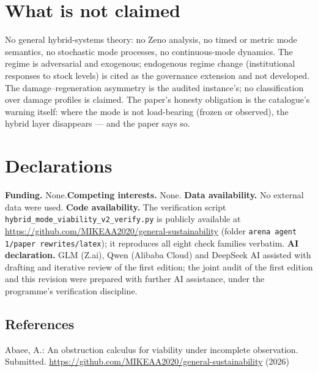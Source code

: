 \documentclass[10pt,twocolumn]{article}
\theoremstyle{definition}
\begin{document}
\section{What is not claimed}

No general hybrid-systems theory: no Zeno analysis, no timed or metric
mode semantics, no stochastic mode processes, no continuous-mode dynamics.
The regime is adversarial and exogenous; endogenous regime change
(institutional responses to stock levels) is cited as the governance
extension and not developed. The damage--regeneration asymmetry is the
audited instance's; no classification over damage profiles is claimed.
The paper's honesty obligation is the catalogue's warning itself: where
the mode is not load-bearing (frozen or observed), the hybrid layer
disappears --- and the paper says so.


\section*{Declarations}
\textbf{Funding.} None.\quad \textbf{Competing interests.} None.\quad
\textbf{Data availability.} No external data were used.\quad
\textbf{Code availability.} The verification script
\texttt{hybrid\_mode\_viability\_v2\_verify.py} is publicly available at
\url{https://github.com/MIKEAA2020/general-sustainability} (folder
\texttt{arena agent 1/paper rewrites/latex}); it reproduces all eight check
families verbatim.\quad
\textbf{AI declaration.} GLM (Z.ai), Qwen (Alibaba Cloud) and DeepSeek AI
assisted with drafting and iterative review of the first edition; the joint
audit of the first edition and this revision were prepared with further AI
assistance, under the programme's verification discipline.

\subsection{References}\label{references}
{\footnotesize

Abaee, A.: An obstruction calculus for viability under incomplete
observation. Submitted.
\url{https://github.com/MIKEAA2020/general-sustainability} (2026)

}
\end{document}
